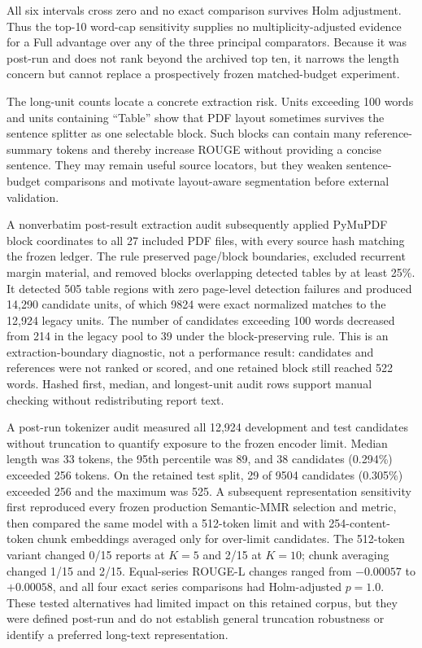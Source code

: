\documentclass[applsci,article,submit,moreauthors]{Definitions/mdpi}
\begin{document}
All six intervals cross zero and no exact comparison survives Holm adjustment. Thus the top-10 word-cap sensitivity supplies no multiplicity-adjusted evidence for a Full advantage over any of the three principal comparators. Because it was post-run and does not rank beyond the archived top ten, it narrows the length concern but cannot replace a prospectively frozen matched-budget experiment.

The long-unit counts locate a concrete extraction risk. Units exceeding 100 words and units containing ``Table'' show that PDF layout sometimes survives the sentence splitter as one selectable block. Such blocks can contain many reference-summary tokens and thereby increase ROUGE without providing a concise sentence. They may remain useful source locators, but they weaken sentence-budget comparisons and motivate layout-aware segmentation before external validation.

A nonverbatim post-result extraction audit subsequently applied PyMuPDF block coordinates to all 27 included PDF files, with every source hash matching the frozen ledger. The rule preserved page/block boundaries, excluded recurrent margin material, and removed blocks overlapping detected tables by at least 25\%. It detected 505 table regions with zero page-level detection failures and produced 14,290 candidate units, of which 9824 were exact normalized matches to the 12,924 legacy units. The number of candidates exceeding 100 words decreased from 214 in the legacy pool to 39 under the block-preserving rule. This is an extraction-boundary diagnostic, not a performance result: candidates and references were not ranked or scored, and one retained block still reached 522 words. Hashed first, median, and longest-unit audit rows support manual checking without redistributing report text.

A post-run tokenizer audit measured all 12,924 development and test candidates without truncation to quantify exposure to the frozen encoder limit. Median length was 33 tokens, the 95th percentile was 89, and 38 candidates (0.294\%) exceeded 256 tokens. On the retained test split, 29 of 9504 candidates (0.305\%) exceeded 256 and the maximum was 525. A subsequent representation sensitivity first reproduced every frozen production Semantic-MMR selection and metric, then compared the same model with a 512-token limit and with 254-content-token chunk embeddings averaged only for over-limit candidates. The 512-token variant changed 0/15 reports at $K=5$ and 2/15 at $K=10$; chunk averaging changed 1/15 and 2/15. Equal-series ROUGE-L changes ranged from $-0.00057$ to $+0.00058$, and all four exact series comparisons had Holm-adjusted $p=1.0$. These tested alternatives had limited impact on this retained corpus, but they were defined post-run and do not establish general truncation robustness or identify a preferred long-text representation.
\end{document}
